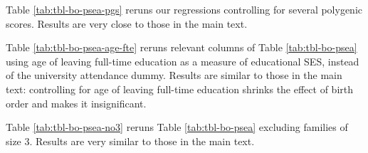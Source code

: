 \documentclass[
]{article}
\theoremstyle{definition}
\theoremstyle{definition}
\theoremstyle{definition}
\theoremstyle{definition}
\theoremstyle{remark}
\begin{document}
Table \ref{tab:tbl-bo-psea-pgs} reruns our regressions controlling for
several polygenic scores. Results are very close to those in the main
text.

Table \ref{tab:tbl-bo-psea-age-fte} reruns relevant columns of Table
\ref{tab:tbl-bo-psea} using age of leaving full-time education as a
measure of educational SES, instead of the university attendance dummy.
Results are similar to those in the main text: controlling for age of
leaving full-time education shrinks the effect of birth order and makes
it insignificant.

Table \ref{tab:tbl-bo-psea-no3} reruns Table \ref{tab:tbl-bo-psea}
excluding families of size 3. Results are very similar to those in the
main text.

 
  \providecommand{\huxb}[2]{\arrayrulecolor[RGB]{#1}\global\arrayrulewidth=#2pt}
  \providecommand{\huxvb}[2]{\color[RGB]{#1}\vrule width #2pt}
  \providecommand{\huxtpad}[1]{\rule{0pt}{#1}}
  \providecommand{\huxbpad}[1]{\rule[-#1]{0pt}{#1}}
\end{document}
